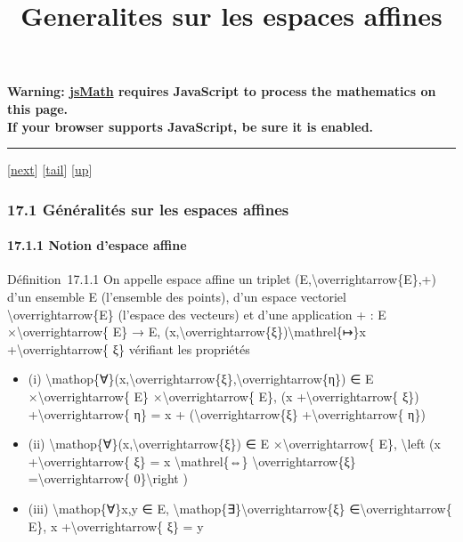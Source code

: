 \documentclass[]{article}
\title{Generalites sur les espaces affines}
\author{}
\date{}
\begin{document}
\maketitle

\textbf{Warning: \href{http://www.math.union.edu/locate/jsMath}{jsMath}
requires JavaScript to process the mathematics on this page.\\ If your
browser supports JavaScript, be sure it is enabled.}

\begin{center}\rule{3in}{0.4pt}\end{center}

{[}\href{coursse93.html}{next}{]}
{[}\hyperref[tailcoursse92.html]{tail}{]}
{[}\href{coursch18.html\#coursse92.html}{up}{]}

\subsubsection{17.1 Généralités sur les espaces affines}

\paragraph{17.1.1 Notion d'espace affine}

Définition~17.1.1 On appelle espace affine un triplet
(E,\textbackslash{}overrightarrow\{E\},+) d'un ensemble E (l'ensemble
des points), d'un espace vectoriel \textbackslash{}overrightarrow\{E\}
(l'espace des vecteurs) et d'une application + : E
×\textbackslash{}overrightarrow\{ E\} → E,
(x,\textbackslash{}overrightarrow\{ξ\})\textbackslash{}mathrel\{↦\}x
+\textbackslash{}overrightarrow\{ ξ\} vérifiant les propriétés

\begin{itemize}
\itemsep1pt\parskip0pt
\item
  (i)
  \textbackslash{}mathop\{∀\}(x,\textbackslash{}overrightarrow\{ξ\},\textbackslash{}overrightarrow\{η\})
  ∈ E ×\textbackslash{}overrightarrow\{ E\}
  ×\textbackslash{}overrightarrow\{ E\}, (x
  +\textbackslash{}overrightarrow\{ ξ\})
  +\textbackslash{}overrightarrow\{ η\} = x +
  (\textbackslash{}overrightarrow\{ξ\} +\textbackslash{}overrightarrow\{
  η\})
\item
  (ii)
  \textbackslash{}mathop\{∀\}(x,\textbackslash{}overrightarrow\{ξ\}) ∈ E
  ×\textbackslash{}overrightarrow\{ E\}, \textbackslash{}left (x
  +\textbackslash{}overrightarrow\{ ξ\} = x \textbackslash{}mathrel\{⇔\}
  \textbackslash{}overrightarrow\{ξ\} =\textbackslash{}overrightarrow\{
  0\}\textbackslash{}right )
\item
  (iii) \textbackslash{}mathop\{∀\}x,y ∈ E,
  \textbackslash{}mathop\{∃\}\textbackslash{}overrightarrow\{ξ\}
  ∈\textbackslash{}overrightarrow\{ E\}, x
  +\textbackslash{}overrightarrow\{ ξ\} = y
\end{itemize}
\end{document}
